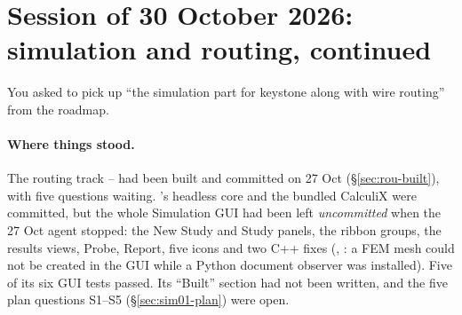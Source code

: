 \section{Session of 30 October 2026: simulation and routing, continued}\label{sec:session-30oct}

You asked to pick up ``the simulation part for keystone along with wire routing'' from the roadmap.

\paragraph{Where things stood.} The routing track -- had been built and committed
on 27 Oct (\S\ref{sec:rou-built}), with five questions waiting. 's headless core and the bundled
CalculiX were committed, but the whole Simulation GUI had been left \emph{uncommitted} when the 27 Oct agent
stopped: the New Study and Study panels, the ribbon groups, the results views, Probe, Report, five icons and
two C++ fixes (, : a FEM mesh could not be
created in the GUI while a Python document observer was installed). Five of its six GUI tests passed. Its
``Built'' section had not been written, and the five plan questions S1--S5 (\S\ref{sec:sim01-plan}) were open.

